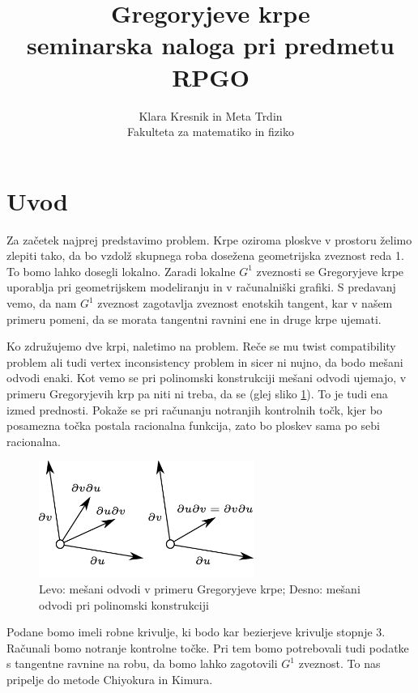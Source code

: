 \documentclass[a4paper,regno]{article}
\title{Gregoryjeve krpe\\
\Large seminarska naloga pri predmetu RPGO}
\date{}
\author{Klara Kresnik in Meta Trdin\\
Fakulteta za matematiko in fiziko\\
}
\begin{document}
\maketitle
\pagebreak



\section{Uvod}
Za začetek najprej predstavimo problem. Krpe oziroma ploskve v prostoru želimo zlepiti tako, da bo vzdolž skupnega roba dosežena geometrijska zveznost reda 1. To bomo lahko dosegli lokalno. Zaradi lokalne $G^1$ zveznosti se Gregoryjeve krpe uporablja pri geometrijskem modeliranju in v računalniški grafiki. S predavanj vemo, da nam $G^1$ zveznost zagotavlja zveznost enotskih tangent, kar v našem primeru pomeni, da se morata tangentni ravnini ene in druge krpe ujemati.

Ko združujemo dve krpi, naletimo na problem. Reče se mu twist compatibility problem ali tudi vertex inconsistency problem in sicer ni nujno, da bodo mešani odvodi enaki.
Kot vemo se pri polinomski konstrukciji mešani odvodi ujemajo, v primeru Gregoryjevih krp pa niti ni treba, da se (glej sliko \ref{fig:mesani odvodi}). To je tudi ena izmed prednosti. Pokaže se pri računanju notranjih kontrolnih točk, kjer bo posamezna točka postala racionalna funkcija, zato bo ploskev sama po sebi racionalna.

\begin{figure}[h]
	\centering
	\includegraphics[width=7cm]{mesani_odvodi_ob.jpg}
	\caption{Levo: mešani odvodi v primeru Gregoryjeve krpe; Desno: mešani odvodi pri polinomski konstrukciji}
	\label{fig:mesani odvodi}
\end{figure}

Podane bomo imeli robne krivulje, ki bodo kar bezierjeve krivulje stopnje $3$. Računali 
bomo notranje kontrolne točke. Pri tem bomo potrebovali tudi podatke s tangentne ravnine 
na robu, da bomo lahko zagotovili $G^1$ zveznost. To nas pripelje do metode Chiyokura in 
Kimura. 
\end{document}
